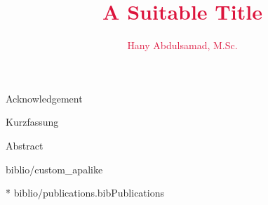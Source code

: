 \documentclass{iasthesis}
\begin{document}

\title{\textcolor{crimson} {A Suitable Title}}
\author{\textcolor{crimson} {Hany Abdulsamad, M.Sc.}}

\maketitle



\begin{tudprints}
	
\end{tudprints}



\begin{dedication}
	
\end{dedication}

\newpage\null\thispagestyle{empty}\newpage



\begin{meta}{Acknowledgement}
	
\end{meta}

\begin{meta}{Kurzfassung}
	\begin{otherlanguage}{ngerman}
		
	\end{otherlanguage}
\end{meta}

\begin{meta}{Abstract}
	
\end{meta}



\setlength{\bibitemsep}{.75\baselineskip plus .05\baselineskip minus .05\baselineskip}

{biblio/custom_apalike}

\nocite{pubs}{*}
{biblio/publications.bib}{Publications}


\end{document}
